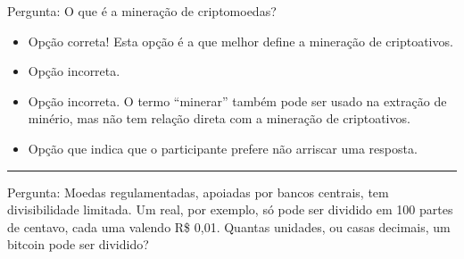 Pergunta: O que é a mineração de criptomoedas?
\begin{itemize}

	\item {}

 Opção correta! Esta opção é a que melhor define a mineração de criptoativos.
 
	\item {}
	
	Opção incorreta.
	
	\item {} 
	
	Opção incorreta. O termo ``minerar'' também pode ser usado na extração de minério, mas não tem relação direta com a mineração de criptoativos.
	 
	\item {}
	
	Opção que indica que o participante prefere não arriscar uma resposta.
	
\end{itemize}

\rule{\linewidth}{0.5mm} 

Pergunta: Moedas regulamentadas, apoiadas por bancos centrais, tem divisibilidade limitada. Um real, por exemplo, só pode ser dividido em 100 partes de
centavo, cada uma valendo R\$ 0,01. Quantas unidades, ou casas decimais, um bitcoin pode ser dividido?

